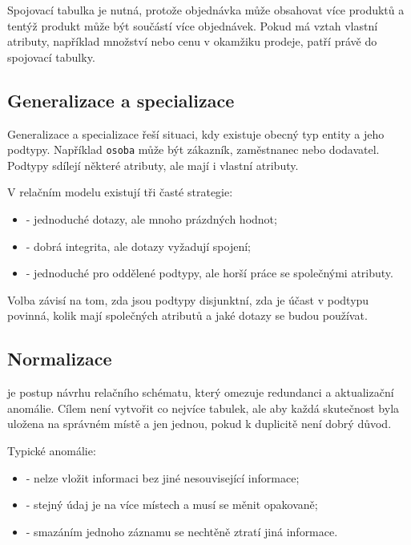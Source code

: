 Spojovací tabulka je nutná, protože objednávka může obsahovat více produktů a tentýž produkt může
být součástí více objednávek. Pokud má vztah vlastní atributy, například množství nebo cenu v okamžiku
prodeje, patří právě do spojovací tabulky.

\subsection{Generalizace a specializace}
Generalizace a specializace řeší situaci, kdy existuje obecný typ entity a jeho podtypy. Například
\texttt{osoba} může být zákazník, zaměstnanec nebo dodavatel. Podtypy sdílejí některé atributy, ale
mají i vlastní atributy.

V relačním modelu existují tři časté strategie:
\begin{itemize}
  \item {} - jednoduché dotazy, ale mnoho prázdných hodnot;
  \item {} - dobrá integrita, ale dotazy vyžadují spojení;
  \item {} - jednoduché pro oddělené podtypy,
  ale horší práce se společnými atributy.
\end{itemize}

Volba závisí na tom, zda jsou podtypy disjunktní, zda je účast v podtypu povinná, kolik mají společných
atributů a jaké dotazy se budou používat.

\subsection{Normalizace}
 je postup návrhu relačního schématu, který omezuje redundanci a aktualizační
anomálie. Cílem není vytvořit co nejvíce tabulek, ale aby každá skutečnost byla uložena na správném
místě a jen jednou, pokud k duplicitě není dobrý důvod.

Typické anomálie:
\begin{itemize}
  \item {} - nelze vložit informaci bez jiné nesouvisející informace;
  \item {} - stejný údaj je na více místech a musí se měnit opakovaně;
  \item {} - smazáním jednoho záznamu se nechtěně ztratí jiná informace.
\end{itemize}

